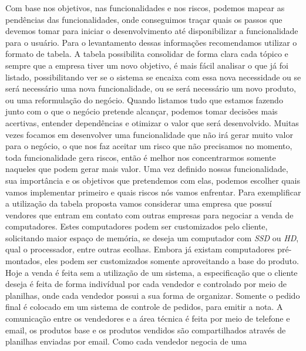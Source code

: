     Com base nos objetivos, nas funcionalidades e nos riscos, podemos mapear as
    pendências das funcionalidades, onde conseguimos traçar quais os passos que
    devemos tomar para iniciar o desenvolvimento até disponibilizar a funcionalidade
    para o usuário. \newline
    Para o levantamento dessas informações recomendamos utilizar o formato de
    tabela. A tabela possibilita consolidar de forma clara cada tópico e sempre
    que a empresa tiver um novo objetivo, é mais fácil analisar o que já foi listado,
    possibilitando ver se o sistema se encaixa com essa nova necessidade ou se será
    necessário uma nova funcionalidade, ou se será necessário um novo produto,
    ou uma reformulação do negócio. Quando listamos tudo que estamos fazendo
    junto com o que o negócio pretende alcançar, podemos tomar decisões mais
    acertivas, entender dependências e otimizar o valor que será desenvolvido.
    Muitas vezes focamos em desenvolver uma funcionalidade que não irá gerar
    muito valor para o negócio, o que nos faz aceitar um risco que não precisamos
    no momento, toda funcionalidade gera riscos, então é melhor nos concentrarmos
    somente naqueles que podem gerar mais valor. \newline
    Uma vez definido nossas funcionalidade, sua importância e os objetivos que
    pretendemos com elas, podemos escolher quais vamos implementar primeiro e
    quais riscos nós vamos enfrentar. \newline
    Para exemplificar a utilização da tabela proposta vamos considerar uma
    empresa que possuí vendores que entram em contato com outras empresas para
    negociar a venda de computadores. Estes computadores podem ser customizados
    pelo cliente, solicitando maior espaço de memória, se deseja um computador
    com \textit{SSD} ou \textit{HD}, qual o processador, entre outras ecolhas.
    Embora já existam computadores pré-montados, eles podem ser customizados
    somente aproveitando a base do produto. \newline
    Hoje a venda é feita sem a utilização de um sistema, a especificação que o
    cliente deseja é feita de forma indivídual por cada vendedor e controlado por
    meio de planilhas, onde cada vendedor possui a sua forma de organizar. Somente
    o pedido final é colocado em um sistema de controle de pedidos, para emitir a
    nota. A comunicação entre os vendedores e a área técnica é feita por meio de
    telefone e email, os produtos base e os produtos vendidos são compartilhados
    através de planilhas enviadas por email. Como cada vendedor negocia de uma
